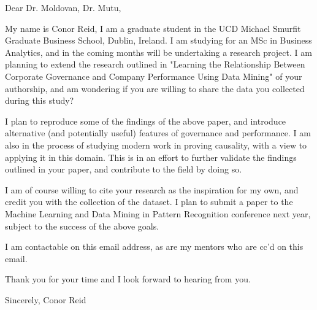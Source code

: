 Dear Dr. Moldovan, Dr. Mutu,

My name is Conor Reid, I am a graduate student in the UCD Michael Smurfit Graduate Business School, Dublin, Ireland. I am studying for an MSc in Business Analytics, and in the coming months will be undertaking a research project. I am planning to extend the research outlined in "Learning the Relationship Between Corporate Governance and Company Performance Using Data Mining" of your authorship, and am wondering if you are willing to share the data you collected during this study?

I plan to reproduce some of the findings of the above paper, and introduce alternative (and potentially useful) features of governance and performance. I am also in the process of studying modern work in proving causality, with a view to applying it in this domain. This is in an effort to further validate the findings outlined in your paper, and contribute to the field by doing so.

I am of course willing to cite your research as the inspiration for my own, and credit you with the collection of the dataset. I plan to submit a paper to the Machine Learning and Data Mining in Pattern Recognition conference next year, subject to the success of the above goals.  

I am contactable on this email address, as are my mentors who are cc'd on this email.

Thank you for your time and I look forward to hearing from you.

Sincerely, 
Conor Reid